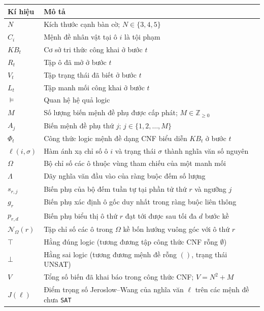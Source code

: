 \begin{longtable}{p{} p{}}
\toprule
\textbf{Kí hiệu} & \textbf{Mô tả} \\
\midrule
\(N\) & Kích thước cạnh bàn cờ; $N\in\{3,4,5\}$ \\
\(C_i\) & Mệnh đề nhân vật tại ô $i$ là tội phạm \\
\(KB_t\) & Cơ sở tri thức công khai ở bước $t$ \\
\(R_t\) & Tập ô đã mở ở bước $t$ \\
\(V_t\) & Tập trạng thái đã biết ở bước $t$ \\
\(L_t\) & Tập manh mối công khai ở bước $t$ \\
\(\models\) & Quan hệ hệ quả logic \\
\(M\) & Số lượng biến mệnh đề phụ được cấp phát; $M \in \mathbb{Z}_{\ge 0}$ \\
\(A_j\) & Biến mệnh đề phụ thứ $j$; $j \in \{1, 2, \dots, M\}$ \\
\(\Phi_t\) & Công thức logic mệnh đề dạng CNF biểu diễn $KB_t$ ở bước $t$ \\
\(\ell(i, \sigma)\) & Hàm ánh xạ chỉ số ô $i$ và trạng thái $\sigma$ thành nghĩa văn số nguyên \\
\(\Omega\) & Bộ chỉ số các ô thuộc vùng tham chiếu của một manh mối \\
\(\Lambda\) & Dãy nghĩa văn đầu vào của ràng buộc đếm số lượng \\
\(s_{r, j}\) & Biến phụ của bộ đếm tuần tự tại phần tử thứ $r$ và ngưỡng $j$ \\
\(g_r\) & Biến phụ xác định ô gốc duy nhất trong ràng buộc liên thông \\
\(p_{r, d}\) & Biến phụ biểu thị ô thứ $r$ đạt tới được sau tối đa $d$ bước kề \\
\(\mathcal{N}_\Omega(r)\) & Tập chỉ số các ô trong $\Omega$ kề bốn hướng vuông góc với ô thứ $r$ \\
\(\top\) & Hằng đúng logic (tương đương tập công thức CNF rỗng $\emptyset$) \\
\(\bot\) & Hằng sai logic (tương đương mệnh đề rỗng $()$, trạng thái UNSAT) \\
\(V\) & Tổng số biến đã khai báo trong công thức CNF; $V = N^2 + M$ \\
\(J(\ell)\) & Điểm trọng số Jeroslow--Wang của nghĩa văn $\ell$ trên các mệnh đề chưa \texttt{SAT} \\
\bottomrule
\end{longtable}


\newpage
